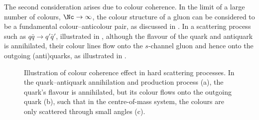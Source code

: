 The second consideration arises due to colour coherence.  In the limit
of a large number of colours, $\Nc\to\infty$, the colour structure of a
gluon can be considered to be a fundamental colour--anticolour pair, as
discussed in .
In a scattering process such as $q\bar{q}\to q'\bar{q}'$, illustrated in
, although the flavour of the quark and
antiquark is annihilated, their colour lines flow onto the $s$-channel
gluon and hence onto the outgoing (anti)quarks, as illustrated in
.
\begin{figure}[t]
  \centerline{\!\!%
    \hfill{}\!\!
    \hfill{}\!\!
    }
  \caption{Illustration of colour coherence effect in hard scattering
    processes. In the quark--antiquark annihilation and production
    process (a), the quark's flavour is annihilated, but its colour
    flows onto the outgoing quark (b), such that in the
    centre-of-mass system, the colours are only scattered through small
    angles (c).}
  \label{fig:hardscattercoherence}
\end{figure}
